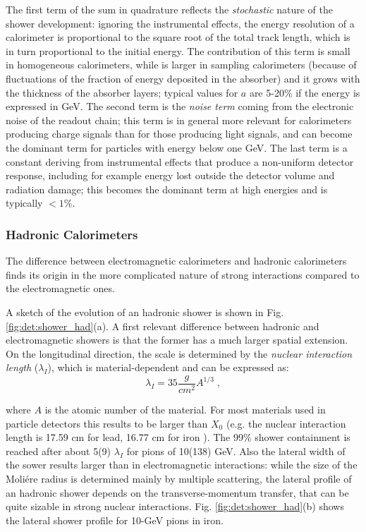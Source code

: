 The first term of the sum in quadrature reflects the \textit{stochastic} nature of the shower development: ignoring the instrumental effects, the energy resolution of a calorimeter is proportional to the square root of the total track length, which is in turn proportional to the initial energy. The contribution of this term is small in homogeneous calorimeters, while is larger in sampling calorimeters (because of fluctuations of the fraction of energy deposited in the absorber) and it grows with the thickness of the absorber layers; typical values for $a$ are 5-20\% if the energy is expressed in GeV. The second term is the \textit{noise term} coming from the electronic noise of the readout chain; this term is in general more relevant for calorimeters producing charge signals than for those producing light signals, and can become the dominant term for particles with energy below one GeV. The last term is a constant deriving from instrumental effects that produce a non-uniform detector response, including for example energy lost outside the detector volume and radiation damage; this becomes the dominant term at high energies and is typically $<1\%$. 



\subsubsection{Hadronic Calorimeters}

The difference between electromagnetic calorimeters and hadronic calorimeters finds its origin in the more complicated nature of strong interactions compared to the electromagnetic ones. 

A sketch of the evolution of an hadronic shower is shown in Fig. \ref{fig:det:shower_had}(a). A first relevant difference between hadronic and electromagnetic showers is that the former has a much larger spatial extension. On the longitudinal direction, the scale is determined by the \textit{nuclear interaction length} ($\lambda_I$), which is material-dependent and can be expressed as:
\begin{equation}
\lambda_I = 35 \frac{g}{cm^2} A^{1/3} \; ,
\end{equation}

where $A$ is the atomic number of the material. For most materials used in particle detectors this results to be larger than $X_0$ (e.g. the nuclear interaction length is 17.59 cm for lead, 16.77 cm for iron \cite{Patrignani:2016xqp}). The 99\% shower containment is reached after about 5(9) $\lambda_I$ for pions of 10(138) GeV. Also the lateral width of the sower results larger than in electromagnetic interactions: while the size of the Moli\'ere radius is determined mainly by multiple scattering, the lateral profile of an hadronic shower depends on the transverse-momentum transfer, that can be quite sizable in strong nuclear interactions. Fig. \ref{fig:det:shower_had}(b) shows the lateral shower profile for 10-GeV pions in iron.

